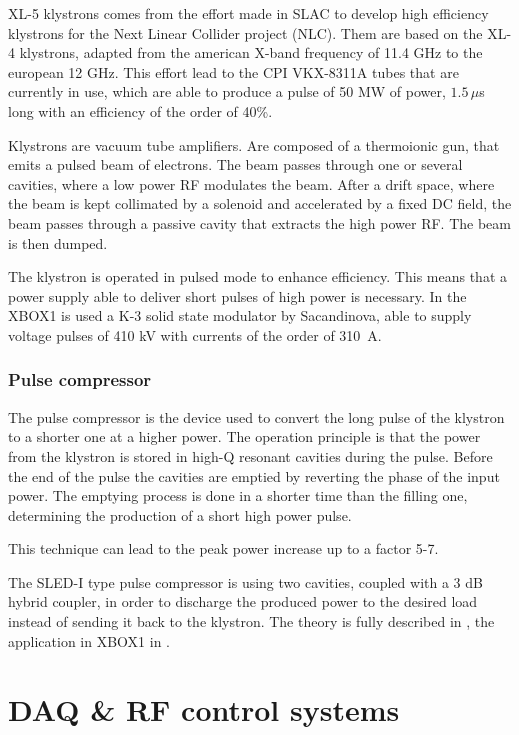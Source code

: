 XL-5 klystrons comes from the effort made in SLAC to develop high efficiency klystrons for the Next Linear Collider project (NLC). Them are based on the XL-4 klystrons, adapted from the american X-band frequency of 11.4 GHz to the european 12 GHz. This effort lead to the CPI VKX-8311A tubes that are currently in use\cite{klystron:CPI}, which are able to produce a pulse of 50 MW of power, $1.5 \, \mu$s long with an efficiency of the order of 40\%.
 
Klystrons are vacuum tube amplifiers. Are composed of a thermoionic gun, that emits a pulsed beam of electrons. The beam passes through one or several cavities, where a low power RF modulates the beam. After a drift space, where the beam is kept collimated by a solenoid and accelerated by a fixed DC field, the beam passes through a passive cavity that extracts the high power RF. The beam is then dumped. 

The klystron is operated in pulsed mode to enhance efficiency. This means that a power supply able to deliver short pulses of high power is necessary. In the XBOX1 is used a K-3 solid state modulator by Sacandinova, able to supply voltage pulses of 410 kV with currents of the order of 310~A.


\subsubsection{Pulse compressor}

The pulse compressor is the device used to convert the long pulse of the klystron to a shorter one at a higher power. The operation principle is that the power from the klystron is stored in high-Q resonant cavities during the pulse. Before the end of the pulse the cavities are emptied by reverting the phase of the input power. The emptying process is done in a shorter time than the filling one, determining the production of a short high power pulse. 

This technique can lead to the peak power increase up to a factor 5-7. 

The SLED-I type pulse compressor is using two cavities, coupled with a 3 dB hybrid coupler, in order to discharge the produced power to the desired load instead of sending it back to the klystron. The theory is fully described in \cite{Fiebig:209756}, the application in XBOX1 in \cite{SLED:ctf3}.

 


\section[DAQ \& RF control systems]{DAQ \& RF control systems}

